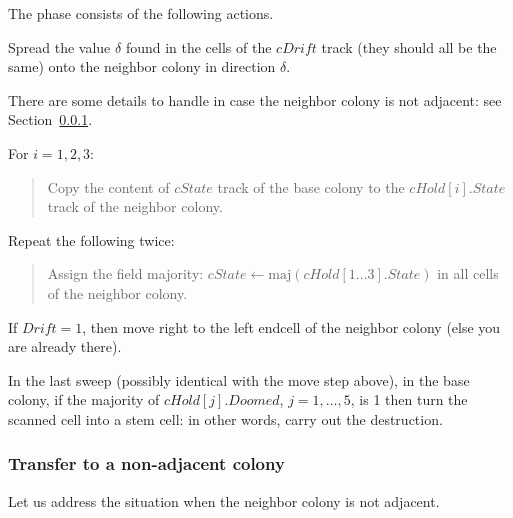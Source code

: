 \documentclass[12pt]{memoir}
\newcommand{\fld}[1]{\ensuremath{\textit{#1}}}
\newcommand{\maj}{\mathrm{maj}}
\newcommand{\Drift}{\fld{Drift}}
\newcommand{\Doomed}{\fld{Doomed}}
\newcommand{\cDrift}{\fld{cDrift}}
\newcommand{\cHold}{\fld{cHold}}
\newcommand{\State}{\fld{State}}
\newcommand{\cState}{\fld{cState}}
\begin{document}
The phase consists of the following actions.
\begin{enumerate}[1.]
\item
  Spread the value \( \delta \) found in the cells of the \( \cDrift \) track
  (they should all be the same)
  onto the neighbor colony in direction \( \delta \).

There are some details to handle in case the neighbor colony is not adjacent:
see Section~\ref{sec:adjacency}.

\item\label{i:transfer-state} For \( i=1,2,3 \):
        \begin{quote}
          Copy the content of \( \cState \) track of the base colony
            to the \( \cHold[i].\State \) track of the neighbor colony.
        \end{quote}

\item Repeat the following twice:
  \begin{quote}
 Assign the field majority: \( \cState\gets \maj(\cHold[1 \dots  3].\State) \)
in all cells of the neighbor colony.    
  \end{quote}
  
\item If \( \Drift = 1 \), then move right to the left endcell of the neighbor colony
(else you are already there).

        \begin{sloppypar}
          \item In the last sweep (possibly identical with the move step above), 
            in the base colony, if the majority of \( \cHold[j].\Doomed \), \( j=1,\dots,5 \), 
            is 1 then turn the scanned cell into a stem cell: in other
            words, carry out the destruction.
          \end{sloppypar}


\end{enumerate}

\subsubsection{Transfer to a non-adjacent colony}\label{sec:adjacency}

Let us address the situation when the neighbor colony is not adjacent.
\end{document}
